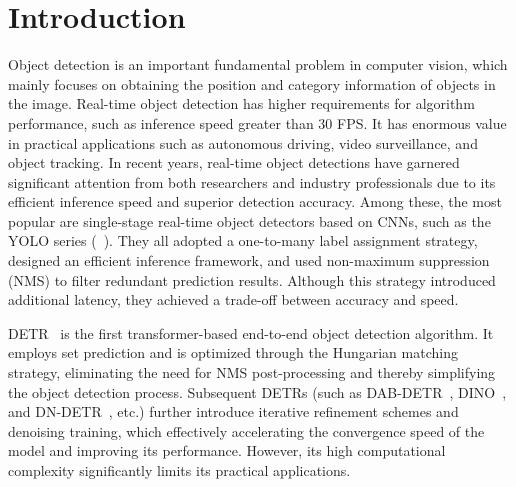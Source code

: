 \documentclass[10pt,twocolumn,letterpaper]{article}
\begin{document}
\section{Introduction}
\label{sec:intro}

Object detection is an important fundamental problem in computer vision, which mainly focuses on obtaining the position and category information of objects in the image. Real-time object detection has higher requirements for algorithm performance, such as inference speed greater than 30 FPS. It has enormous value in practical applications such as autonomous driving, video surveillance, and object tracking. In recent years, real-time object detections have garnered significant attention from both researchers and industry professionals due to its efficient inference speed and superior detection accuracy. Among these, the most popular are single-stage real-time object detectors based on CNNs, such as the YOLO series (~\cite{bochkovskiy2020yolov4, jocher2022yolov5, li2022yolov6, wang2023yolov7, yolov8, wang2024yolov9, wang2024yolov10}). They all adopted a one-to-many label assignment strategy, designed an efficient inference framework, and used non-maximum suppression (NMS) to filter redundant prediction results. Although this strategy introduced additional latency, they achieved a trade-off between accuracy and speed.

DETR~\cite{carion2020detr} is the first transformer-based end-to-end object detection algorithm. It employs set prediction and is optimized through the Hungarian matching strategy, eliminating the need for NMS post-processing and thereby simplifying the object detection process. Subsequent DETRs (such as DAB-DETR~\cite{liu2022Dab-detr}, DINO~\cite{zhang2022dino}, and DN-DETR~\cite{li2022Dn-detr}, etc.) further introduce iterative refinement schemes and denoising training,
which effectively accelerating the convergence speed of the model and improving its performance. 
However, its high computational complexity significantly limits its practical applications.
\end{document}
